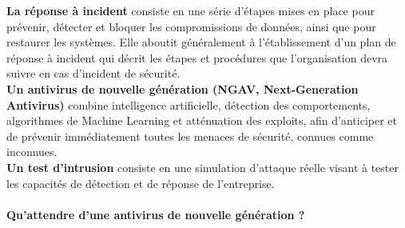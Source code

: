\textbf{La réponse à incident} consiste en une série d’étapes mises en place pour prévenir, détecter et bloquer les compromissions de données, ainsi que pour restaurer les systèmes. Elle aboutit généralement à l’établissement d’un plan de réponse à incident qui décrit les étapes et procédures que l’organisation devra suivre en cas d’incident de sécurité.\\

\textbf{Un antivirus de nouvelle génération (NGAV, Next-Generation Antivirus)} combine intelligence artificielle, détection des comportements, algorithmes de Machine Learning et atténuation des exploits, afin d’anticiper et de prévenir immédiatement toutes les menaces de sécurité, connues comme inconnues.\\

\textbf{Un test d’intrusion} consiste en une simulation d’attaque réelle visant à tester les capacités de détection et de réponse de l’entreprise.

\paragraph{Qu’attendre d’une antivirus de nouvelle génération ?\\}


